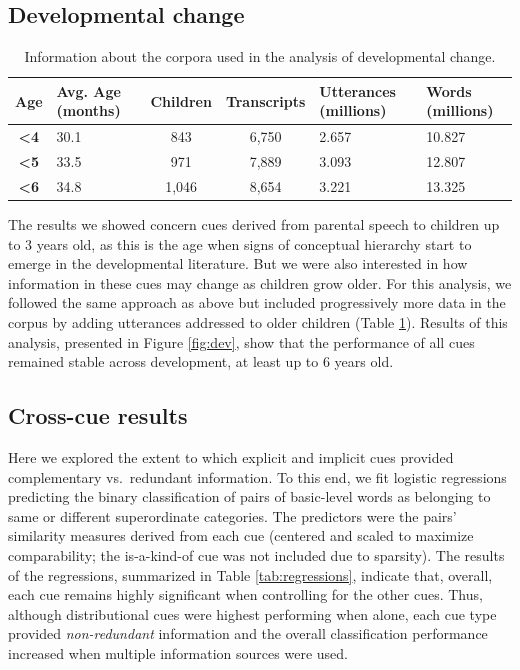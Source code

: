 \documentclass[english,,man,floatsintext]{apa6}
\begin{document}
\hypertarget{developmental-change}{%
\subsection{Developmental change}\label{developmental-change}}

\begin{table}[!htbp] \centering 
\begin{tabularx}{\linewidth}{cXccXX}

\textbf{Age} & Avg. Age (months) & Children & Transcripts & Utterances (millions) & Words (millions)\\
\hline

\textbf{\textless4} & 30.1 & 843 & 6,750 & 2.657 & 10.827\\

\textbf{\textless5} & 33.5 & 971 & 7,889 & 3.093 & 12.807\\

\textbf{\textless6} & 34.8 & 1,046 & 8,654 & 3.221 & 13.325\\

\hline
\end{tabularx}
\caption{\label{tab:development} Information about the corpora used in the analysis of developmental change.}
\end{table}

The results we showed concern cues derived from parental speech to children up to 3
years old, as this is the age when signs of conceptual hierarchy start
to emerge in the developmental literature. But we were also interested
in how information in these cues may change as children grow older.
For this analysis, we followed the same approach as above but included progressively more data in the corpus by adding utterances addressed to older children (Table \ref{tab:development}). Results of this analysis, presented in Figure \ref{fig:dev}, show that the performance of all cues remained stable across development, at least up to 6 years old.

\hypertarget{cross-cue-results}{%
\subsection{Cross-cue results}\label{cross-cue-results}}

Here we explored the extent to which explicit and implicit cues provided
complementary vs.~redundant information. To this end, we fit logistic
regressions predicting the binary classification of pairs of basic-level
words as belonging to same or different superordinate categories. The
predictors were the pairs' similarity measures derived from each cue (centered and scaled to maximize comparability; the is-a-kind-of cue was not included due to sparsity). The results of the regressions,
summarized in Table \ref{tab:regressions}, indicate that, overall, each cue remains highly significant when controlling for the other cues. Thus, although distributional cues were highest performing when alone, each cue type provided \emph{non-redundant} information and the overall classification performance increased when multiple information sources were used.
\end{document}
